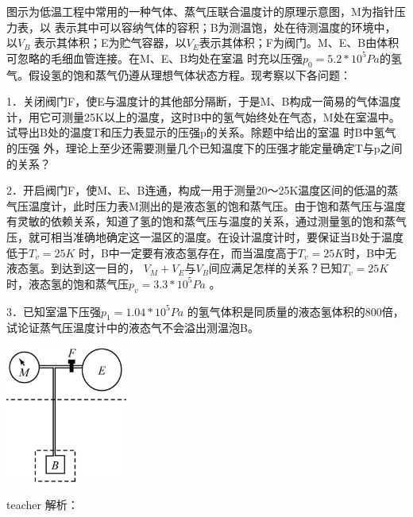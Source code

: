 \begin{example}
	图示为低温工程中常用的一种气体、蒸气压联合温度计的原理示意图，M为指针压力表，以 表示其中可以容纳气体的容积；B为测温饱，处在待测温度的环境中，以$V_B$ 表示其体积；E为贮气容器，以$V_E$表示其体积；F为阀门。M、E、B由体积可忽略的毛细血管连接。在M、E、B均处在室温 时充以压强$p_0=5.2*10^5Pa$的氢气。假设氢的饱和蒸气仍遵从理想气体状态方程。现考察以下各问题：
	
	1．关闭阀门F，使E与温度计的其他部分隔断，于是M、B构成一简易的气体温度计，用它可测量25K以上的温度，这时B中的氢气始终处在气态，M处在室温中。试导出B处的温度T和压力表显示的压强p的关系。除题中给出的室温 时B中氢气的压强 外，理论上至少还需要测量几个已知温度下的压强才能定量确定T与p之间的关系？
	
	2．开启阀门F，使M、E、B连通，构成一用于测量20～25K温度区间的低温的蒸气压温度计，此时压力表M测出的是液态氢的饱和蒸气压。由于饱和蒸气压与温度有灵敏的依赖关系，知道了氢的饱和蒸气压与温度的关系，通过测量氢的饱和蒸气压，就可相当准确地确定这一温区的温度。在设计温度计时，要保证当B处于温度低于$T_v=25K$ 时，B中一定要有液态氢存在，而当温度高于$T_v=25K$时，B中无液态氢。到达到这一目的， $V_M+V_E$与$V_B$间应满足怎样的关系？已知$T_v=25K$时，液态氢的饱和蒸气压$p_v=3.3*10^5Pa$ 。
	
	3．已知室温下压强$p_1=1.04*10^5Pa$ 的氢气体积是同质量的液态氢体积的800倍，试论证蒸气压温度计中的液态气不会溢出测温泡B。
\begin{flushright}
\includegraphics[width = 0.3\textwidth]{images/problem-2.pdf} 
\end{flushright}
\begin{taggedblock}{teacher}
解析：
\end{taggedblock}
\end{example}


